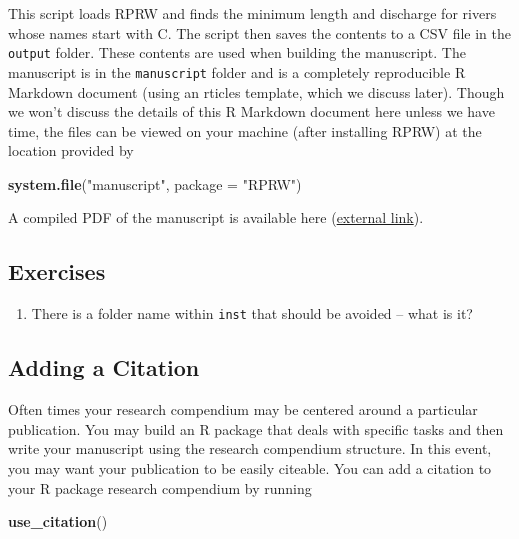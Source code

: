 \documentclass[
]{book}
\newenvironment{Shaded}{\begin{snugshade}}{\end{snugshade}}
\newcommand{\DataTypeTok}[1]{\textcolor[rgb]{0.13,0.29,0.53}{#1}}
\newcommand{\KeywordTok}[1]{\textcolor[rgb]{0.13,0.29,0.53}{\textbf{#1}}}
\newcommand{\NormalTok}[1]{#1}
\newcommand{\StringTok}[1]{\textcolor[rgb]{0.31,0.60,0.02}{#1}}
\providecommand{\tightlist}{%
  \setlength{\itemsep}{0pt}\setlength{\parskip}{0pt}}
\begin{document}
This script loads RPRW and finds the minimum length and discharge for rivers whose names start with C. The script then saves the contents to a CSV file in the \texttt{output} folder. These contents are used when building the manuscript. The manuscript is in the \texttt{manuscript} folder and is a completely reproducible R Markdown document (using an rticles template, which we discuss later). Though we won't discuss the details of this R Markdown document here unless we have time, the files can be viewed on your machine (after installing RPRW) at the location provided by

\begin{Shaded}
\begin{Highlighting}[]
\KeywordTok{system.file}\NormalTok{(}\StringTok{"manuscript"}\NormalTok{, }\DataTypeTok{package =} \StringTok{"RPRW"}\NormalTok{)}
\end{Highlighting}
\end{Shaded}

A compiled PDF of the manuscript is available here (\href{https://github.com/michaeldumelle/RPRW/blob/main/inst/manuscript/manuscript.pdf}{external link}).

\hypertarget{ex-set9}{%
\subsection{Exercises}\label{ex-set9}}

\begin{enumerate}
\def\labelenumi{\arabic{enumi}.}
\tightlist
\item
  There is a folder name within \texttt{inst} that should be avoided -- what is it?
\end{enumerate}

\hypertarget{citation}{%
\subsection{Adding a Citation}\label{citation}}

Often times your research compendium may be centered around a particular publication. You may build an R package that deals with specific tasks and then write your manuscript using the research compendium structure. In this event, you may want your publication to be easily citeable. You can add a citation to your R package research compendium by running

\begin{Shaded}
\begin{Highlighting}[]
\KeywordTok{use_citation}\NormalTok{()}
\end{Highlighting}
\end{Shaded}
\end{document}
